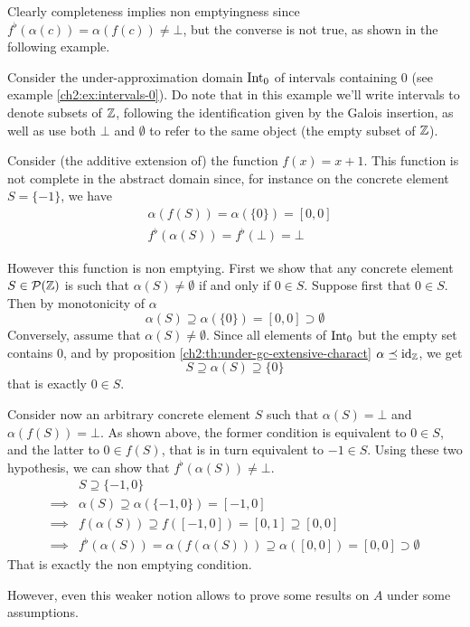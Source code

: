 Clearly completeness implies non emptyingness since $f^{\flat}(\alpha(c)) = \alpha(f(c)) \neq \bot$, but the converse is not true, as shown in the following example.
\begin{example}\label{ch3:ex:ne-not-complete}
	Consider the under-approximation domain $\text{Int}_0$ of intervals containing $0$ (see example \ref{ch2:ex:intervals-0}). Do note that in this example we'll write intervals to denote subsets of $\mathbb{Z}$, following the identification given by the Galois insertion, as well as use both $\bot$ and $\emptyset$ to refer to the same object (the empty subset of $\mathbb{Z}$).

	Consider (the additive extension of) the function $f(x) = x + 1$. This function is not complete in the abstract domain since, for instance on the concrete element $S = \{ -1 \}$, we have
	\begin{align*}
		&\alpha(f(S)) = \alpha(\{ 0 \}) = [0, 0] \\
		&f^{\flat}(\alpha(S)) = f^{\flat}(\bot) = \bot
	\end{align*}

	However this function is non emptying.
	First we show that any concrete element $S \in \mathcal{P}(\mathbb{Z})$ is such that $\alpha(S) \neq \emptyset$ if and only if $0 \in S$.
	Suppose first that $0 \in S$. Then by monotonicity of $\alpha$
	\[
	\alpha(S) \supseteq \alpha(\{ 0 \}) = [0, 0] \supset \emptyset
	\]
	Conversely, assume that $\alpha(S) \neq \emptyset$. Since all elements of $\text{Int}_0$ but the empty set contains $0$, and by proposition \ref{ch2:th:under-gc-extensive-charact} $\alpha \preceq \text{id}_{\mathbb{Z}}$, we get
	\[
	S \supseteq \alpha(S) \supseteq \{ 0 \}
	\]
	that is exactly $0 \in S$.

	Consider now an arbitrary concrete element $S$ such that $\alpha(S) = \bot$ and $\alpha(f(S)) = \bot$. As shown above, the former condition is equivalent to $0 \in S$, and the latter to $0 \in f(S)$, that is in turn equivalent to $-1 \in S$. Using these two hypothesis, we can show that $f^{\flat}(\alpha(S)) \neq \bot$.
	\begin{align*}
		&S \supseteq \{ -1, 0 \} \\
		\implies& \alpha(S) \supseteq \alpha(\{ -1, 0 \}) = [-1, 0] \\
		\implies& f(\alpha(S)) \supseteq f([-1, 0]) = [0, 1] \supseteq [0, 0] \\
		\implies& f^{\flat}(\alpha(S)) = \alpha(f(\alpha(S))) \supseteq \alpha([0, 0]) = [0, 0] \supset \emptyset
	\end{align*}
	That is exactly the non emptying condition.
\end{example}
However, even this weaker notion allows to prove some results on $A$ under some assumptions.

